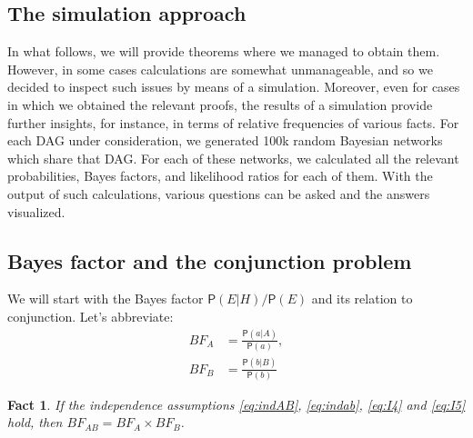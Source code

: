 \documentclass[
  10pt,
  dvipsnames,enabledeprecatedfontcommands]{scrartcl}
\newtheorem{fact}{Fact}
\newcommand{\pr}[1]{\ensuremath{\mathsf{P}(#1)}}
\begin{document}
\hypertarget{the-simulation-approach}{%
\subsection{The simulation approach}\label{the-simulation-approach}}

In what follows, we will provide theorems where we managed to obtain
them. However, in some cases calculations are somewhat unmanageable, and
so we decided to inspect such issues by means of a simulation. Moreover,
even for cases in which we obtained the relevant proofs, the results of
a simulation provide further insights, for instance, in terms of
relative frequencies of various facts. For each DAG under consideration,
we generated 100k random Bayesian networks which share that DAG. For
each of these networks, we calculated all the relevant probabilities,
Bayes factors, and likelihood ratios for each of them. With the output
of such calculations, various questions can be asked and the answers
visualized.

\hypertarget{bayes-factor-and-the-conjunction-problem}{%
\subsection{Bayes factor and the conjunction
problem}\label{bayes-factor-and-the-conjunction-problem}}

We will start with the Bayes factor \(\pr{E \vert H}/\pr{E}\) and its
relation to conjunction. Let's abbreviate: \begin{align*}
BF_A  & =  \frac{\pr{a \vert A}}{\pr{a}},\\
BF_B & = \frac{\pr{b \vert B}}{\pr{b}}
\end{align*}

\begin{fact} If the independence assumptions \eqref{eq:indAB}, \eqref{eq:indab}, \eqref{eq:I4} and \eqref{eq:I5} hold, then 
$BF_{AB} = BF_A \times BF_B$. \label{fac:BFindep}
\end{fact}
\end{document}

